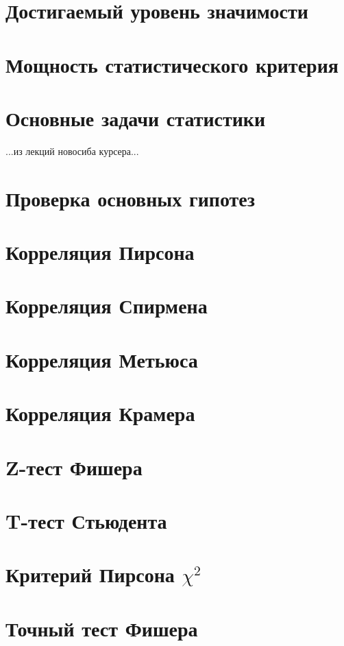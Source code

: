 \section{Достигаемый уровень значимости}


\section{Мощность статистического критерия}


\section{Основные задачи статистики}

...из лекций новосиба  курсера...


\section{Проверка основных гипотез}


\section{Корреляция Пирсона}


\section{Корреляция Спирмена}


\section{Корреляция Метьюса}


\section{Корреляция Крамера}


\section{Z-тест Фишера}


\section{T-тест Стьюдента}


\section{Критерий Пирсона $\chi^2$}


\section{Точный тест Фишера}



